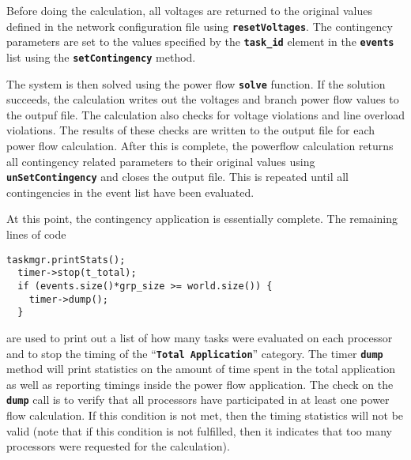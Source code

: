Before doing the calculation, all voltages are returned to the original values defined in the network configuration file using \texttt{\textbf{resetVoltages}}. The contingency parameters are set to the values specified by the \texttt{\textbf{task\_id}} element in the \texttt{\textbf{events}} list using the \texttt{\textbf{setContingency}} method.

The system is then solved using the power flow \texttt{\textbf{solve}} function. If the solution succeeds, the calculation writes out the voltages and branch power flow values to the outpuf file. The calculation also checks for voltage violations and line overload violations. The results of these checks are written to the output file for each power flow calculation. After this is complete, the powerflow calculation returns all contingency related parameters to their original values using \texttt{\textbf{unSetContingency}} and closes the output file. This is repeated until all contingencies in the event list have been evaluated.

At this point, the contingency application is essentially complete. The remaining lines of code

{
\color{red}
\begin{Verbatim}[fontseries=b]
  taskmgr.printStats();
  timer->stop(t_total);
  if (events.size()*grp_size >= world.size()) {
    timer->dump();
  }
\end{Verbatim}
}

are used to print out a list of how many tasks were evaluated on each processor and to stop the timing of the ``\texttt{\textbf{Total Application}}'' category. The timer \texttt{\textbf{dump}} method will print statistics on the amount of time spent in the total application as well as reporting timings inside the power flow application. The check on the \texttt{\textbf{dump}} call is to verify that all processors have participated in at least one power flow calculation.
If this condition is not met, then the timing statistics will not be valid (note
that if this condition is not fulfilled, then it indicates that too many
processors were requested for the calculation).
